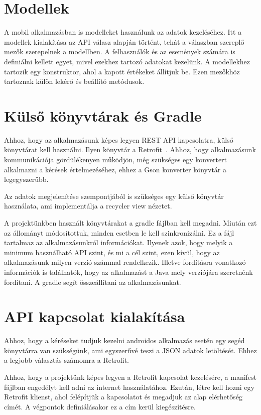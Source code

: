 \documentclass[
]{thesis-ekf}
\theoremstyle{definition}
\theoremstyle{remark}
\begin{document}
	\section{Modellek}
	A mobil alkalmazásban is modelleket használunk az adatok kezeléséhez. Itt a modellek kialakítása az API válasz alapján történt, tehát a válaszban szereplő mezők szerepelnek a modellben. A felhasználók és az események számára is definiálni kellett egyet, mivel ezekhez tartozó adatokat kezelünk. 
	A modellekhez tartozik egy konstruktor, ahol a kapott értékeket állítjuk be. Ezen mezőkhöz tartoznak külön lekérő és beállító metódusok.
	
	\section{Külső könyvtárak és Gradle}
	Ahhoz, hogy az alkalmazásunk képes legyen REST API kapcsolatra, külső könyvtárat kell használni. Ilyen könyvtár a Retrofit~\cite{retrofit_doc}. Ahhoz, hogy alkalmazásunk kommunikációja gördülékenyen működjön, még szükséges egy konvertert alkalmazni a kérések értelmezéséhez, ehhez a Gson konverter könyvtár a legegyszerűbb. 
	
	Az adatok megjelenítése szempontjából is szükséges egy külső könyvtár használata, ami implementálja a recycler view nézetet.
	
	A projektünkben használt könyvtárakat a gradle fájlban kell megadni. Miután ezt az állományt módosítottuk, minden esetben le kell szinkronizálni. Ez a fájl tartalmaz az alkalmazásunkról információkat. Ilyenek azok, hogy melyik a minimum használható API szint, és mi a cél szint, ezen kívül, hogy az alkalmazásunk milyen verzió számmal rendelkezik. Illetve fordításra vonatkozó információk is találhatók, hogy az alkalmazást a Java mely verziójára szeretnénk fordítani. A gradle segít összeállítani az alkalmazásunkat.
	
	\section{API kapcsolat kialakítása}
	Ahhoz, hogy a kéréseket tudjuk kezelni androidos alkalmazás esetén egy segéd könyvtárra van szükségünk, ami egyszerűvé teszi a JSON adatok letöltését. Ehhez a legjobb választás számomra a Retrofit.
	
	Ahhoz, hogy a projektünk képes legyen a Retrofit kapcsolat kezelésére, a manifest fájlban engedélyt kell adni az internet használatához. Ezután, létre kell hozni egy Retrofit klienst, ahol felépítjük a kapcsolatot és megadjuk az alap elérhetőség címét. A végpontok definiálásakor ez a cím kerül kiegészítésre. 
	
\end{document}
